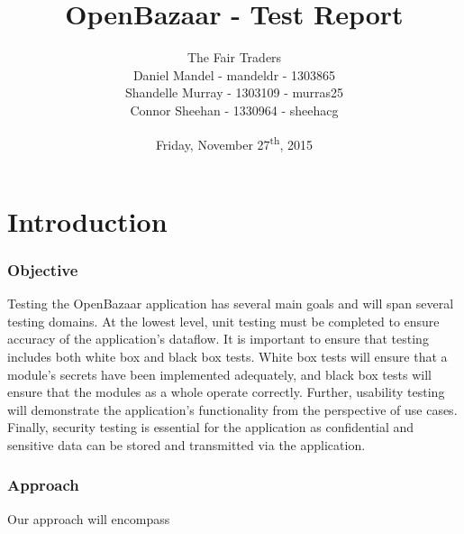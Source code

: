\documentclass{article}
\begin{document}
\title{OpenBazaar - Test Report}
\author{The Fair Traders\\Daniel Mandel - mandeldr - 1303865\\Shandelle Murray - 1303109 - murras25\\Connor Sheehan - 1330964 - sheehacg}
\date{Friday, November 27\textsuperscript{th}, 2015}
\maketitle


\newpage
\tableofcontents
\newpage

\part*{Introduction}
\section{Objective}
Testing the OpenBazaar application has several main goals and will span several testing domains. At the lowest level, unit testing must be completed to ensure accuracy of the application's dataflow. It is important to ensure that testing includes both white box and black box tests. White box tests will ensure that a module's secrets have been implemented adequately, and black box tests will ensure that the modules as a whole operate correctly. Further, usability testing will demonstrate the application's functionality from the perspective of use cases. Finally, security testing is essential for the application as confidential and sensitive data can be stored and transmitted via the application.

\section{Approach}
Our approach will encompass 
\end{document}
